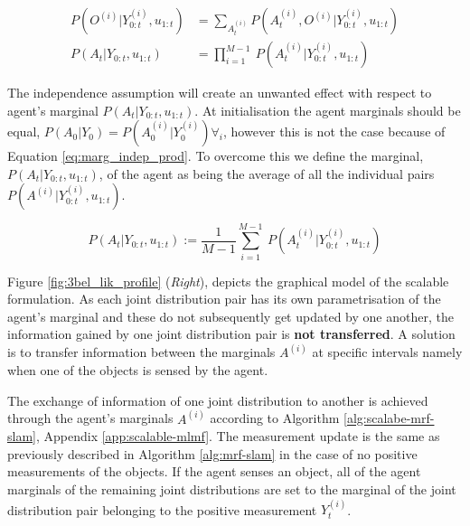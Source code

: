 \documentclass{frontiersSCNS} %
\begin{document}
\begin{align}
 P(O^{(i)}|Y^{(i)}_{0:t},u_{1:t}) &= \sum\limits_{A^{(i)}_t} P(A^{(i)}_t,O^{(i)}|Y^{(i)}_{0:t},u_{1:t}) \label{eq:marg_indep} \\
 P(A_t|Y_{0:t},u_{1:t})   &=\prod\limits_{i=1}^{M-1} \ P(A^{(i)}_t|Y^{(i)}_{0:t},u_{1:t}) \label{eq:marg_indep_prod}  
\end{align}

The independence assumption will create an unwanted effect with respect to agent's marginal $P(A_t|Y_{0:t},u_{1:t})$. 
At initialisation the agent marginals should be equal, $P(A_0|Y_0) = P(A^{(i)}_0|Y^{(i)}_0) \forall_i$, however this is not the case because of 
Equation \ref{eq:marg_indep_prod}. To overcome this we define the marginal, $P(A_t|Y_{0:t},u_{1:t})$, of the agent as being the average of all the individual
pairs $P(A^{(i)}|Y^{(i)}_{0:t},u_{1:t})$.

\begin{equation}
  P(A_t|Y_{0:t},u_{1:t}) := \frac{1}{M-1} \sum\limits_{i=1}^{M-1} \ P(A^{(i)}_t|Y^{(i)}_{0:t},u_{1:t}) \label{eq:marg_indep_sum}
\end{equation}

Figure \ref{fig:3bel_lik_profile} (\textit{Right}), depicts the graphical model of the scalable formulation. 
As each joint distribution pair has its own parametrisation of the agent's marginal and these do not subsequently get updated by one another,
the information gained by one joint distribution pair is \textbf{not transferred}.
A solution is to transfer information between the marginals $A^{(i)}$ at specific intervals namely when one of the objects is sensed by the agent. 

The exchange of information of one joint distribution to another is achieved through the agent's marginals $A^{(i)}$ according to Algorithm \ref{alg:scalabe-mrf-slam},  Appendix \ref{app:scalable-mlmf}.
The measurement update is the same as previously described in Algorithm \ref{alg:mrf-slam}  in the case of no positive measurements of the objects. If the agent
senses an object, all of the agent marginals of the remaining joint distributions are set to the marginal of the joint distribution pair belonging to the positive 
measurement $Y^{(i)}_t$. 

\end{document}
